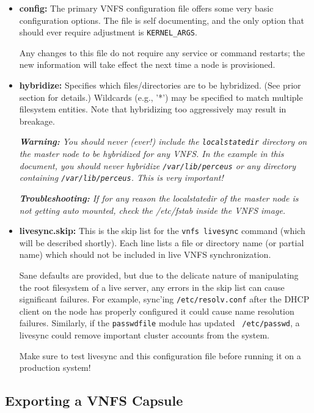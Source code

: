 \documentclass[10pt,letterpaper]{report}
\begin{document}
\begin{itemize}

\item {\bf config:}  The primary VNFS configuration file offers some very basic
configuration options.  The file is self documenting, and the only option that
should ever require adjustment is {\tt KERNEL\_ARGS}.

Any changes to this file do not require any service or command restarts; the
new information will take effect the next time a node is provisioned.

\item {\bf hybridize:}  Specifies which files/directories are to be
hybridized.  (See prior section for details.)  Wildcards (e.g., '*') may be
specified to match multiple filesystem entities.  Note that hybridizing too
aggressively may result in breakage.

{\it {\bf Warning:}  You should never (ever!) include the {\tt localstatedir}
directory on the master node to be hybridized for any VNFS.  In the example in
this document, you should never hybridize {\tt /var/lib/perceus} or any
directory containing {\tt /var/lib/perceus}.  This is very important!}

{\it {\bf Troubleshooting:}  If for any reason the localstatedir of the master
node is not getting auto mounted, check the /etc/fstab inside the VNFS image.}

\item {\bf livesync.skip:}  This is the skip list for the {\tt vnfs livesync}
command (which will be described shortly).  Each line lists a file or
directory name (or partial name) which should not be included in live VNFS
synchronization.

Sane defaults are provided, but due to the delicate nature of manipulating the
root filesystem of a live server, any errors in the skip list can cause
significant failures.  For example, sync'ing {\tt /etc/resolv.conf} after the
DHCP client on the node has properly configured it could cause name resolution
failures.  Similarly, if the {\tt passwdfile} module has updated {\tt
/etc/passwd}, a livesync could remove important cluster accounts from the
system.

Make sure to test livesync and this configuration file before running it on a
production system!

\end{itemize}

\subsection{Exporting a VNFS Capsule}
\end{document}
